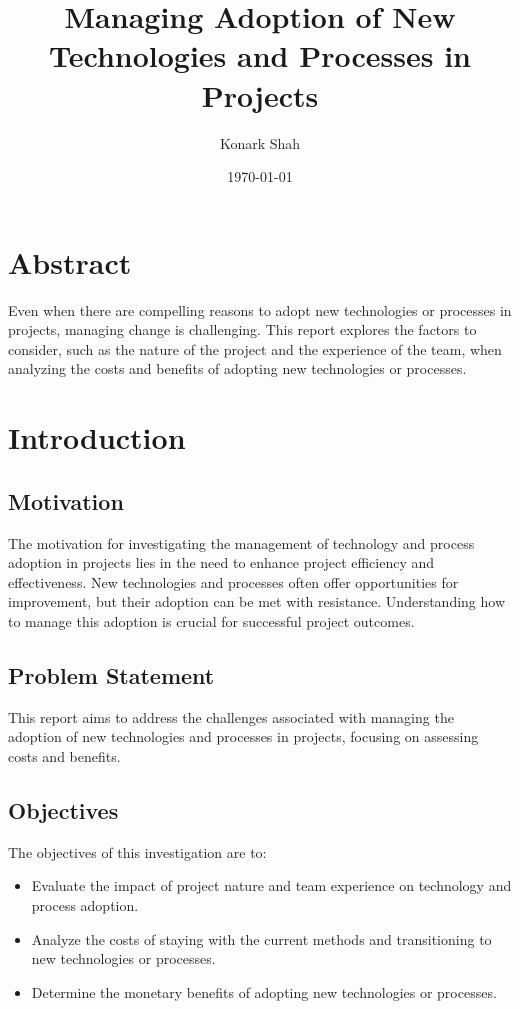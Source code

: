 \documentclass{article}
\title{Managing Adoption of New Technologies and Processes in Projects}
\author{Konark Shah}
\date{\today}
\begin{document}
\maketitle

\tableofcontents

\newpage

\section{Abstract}
Even when there are compelling reasons to adopt new technologies or processes in projects, managing change is challenging. This report explores the factors to consider, such as the nature of the project and the experience of the team, when analyzing the costs and benefits of adopting new technologies or processes.

\section{Introduction}
\subsection{Motivation}
The motivation for investigating the management of technology and process adoption in projects lies in the need to enhance project efficiency and effectiveness. New technologies and processes often offer opportunities for improvement, but their adoption can be met with resistance. Understanding how to manage this adoption is crucial for successful project outcomes.
\subsection{Problem Statement}
This report aims to address the challenges associated with managing the adoption of new technologies and processes in projects, focusing on assessing costs and benefits.
\subsection{Objectives}
The objectives of this investigation are to:
\begin{itemize}
  \item Evaluate the impact of project nature and team experience on technology and process adoption.
  \item Analyze the costs of staying with the current methods and transitioning to new technologies or processes.
  \item Determine the monetary benefits of adopting new technologies or processes.
\end{itemize}
\end{document}
